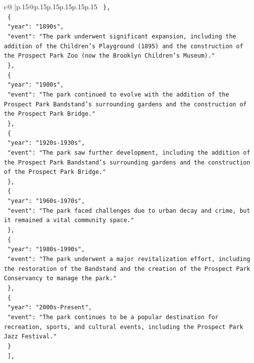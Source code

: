 \documentclass{article}
\begin{document}
{\begin{supertabular}{c@{$\;$}|p{.15\linewidth}@{}p{.15\linewidth}p{.15\linewidth}p{.15\linewidth}p{.15\linewidth}p{.15\linewidth}}
{{{\texttt{    \},} \\
\texttt{    \{} \\
\texttt{      "year": "1890s",} \\
\texttt{      "event": "The park underwent significant expansion, including the addition of the Children's Playground (1895) and the construction of the Prospect Park Zoo (now the Brooklyn Children's Museum)."} \\
\texttt{    \},} \\
\texttt{    \{} \\
\texttt{      "year": "1900s",} \\
\texttt{      "event": "The park continued to evolve with the addition of the Prospect Park Bandstand's surrounding gardens and the construction of the Prospect Park Bridge."} \\
\texttt{    \},} \\
\texttt{    \{} \\
\texttt{      "year": "1920s{-}1930s",} \\
\texttt{      "event": "The park saw further development, including the addition of the Prospect Park Bandstand's surrounding gardens and the construction of the Prospect Park Bridge."} \\
\texttt{    \},} \\
\texttt{    \{} \\
\texttt{      "year": "1960s{-}1970s",} \\
\texttt{      "event": "The park faced challenges due to urban decay and crime, but it remained a vital community space."} \\
\texttt{    \},} \\
\texttt{    \{} \\
\texttt{      "year": "1980s{-}1990s",} \\
\texttt{      "event": "The park underwent a major revitalization effort, including the restoration of the Bandstand and the creation of the Prospect Park Conservancy to manage the park."} \\
\texttt{    \},} \\
\texttt{    \{} \\
\texttt{      "year": "2000s{-}Present",} \\
\texttt{      "event": "The park continues to be a popular destination for recreation, sports, and cultural events, including the Prospect Park Jazz Festival."} \\
\texttt{    \}} \\
\texttt{  {]},} \\
}}}
\end{supertabular}}
\end{document}
